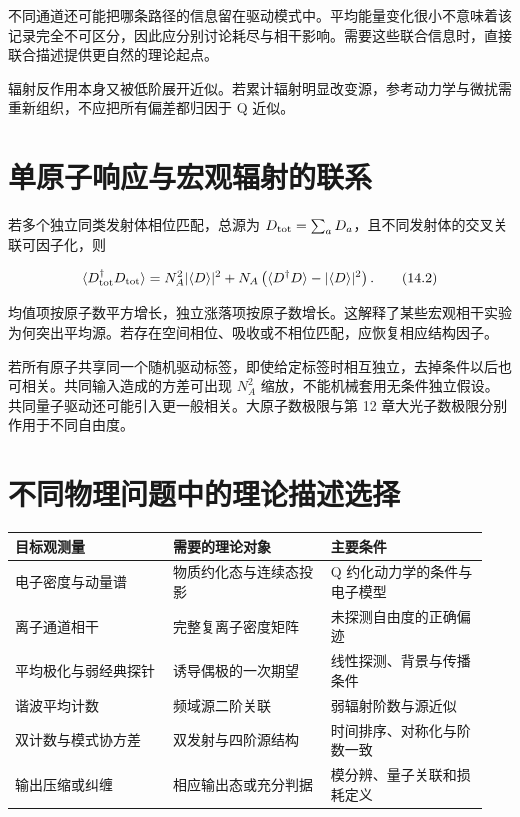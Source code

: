 \documentclass[UTF8,a4paper,zihao=-4,openany,fontset=fandol]{ctexbook}
\begin{document}
不同通道还可能把哪条路径的信息留在驱动模式中。平均能量变化很小不意味着该记录完全不可区分，因此应分别讨论耗尽与相干影响。需要这些联合信息时，直接联合描述提供更自然的理论起点。



辐射反作用本身又被低阶展开近似。若累计辐射明显改变源，参考动力学与微扰需重新组织，不应把所有偏差都归因于 Q 近似。



\section{单原子响应与宏观辐射的联系}\label{sec:14:9}


若多个独立同类发射体相位匹配，总源为 $D_{\rm tot}=\sum_aD_a$，且不同发射体的交叉关联可因子化，则



\begin{equation*}
\langle D_{\rm tot}^\dagger D_{\rm tot}\rangle
=N_A^2|\langle D\rangle|^2
+N_A\left(\langle D^\dagger D\rangle-|\langle D\rangle|^2\right).
\tag{14.2}\label{eq:14.2}
\end{equation*}


均值项按原子数平方增长，独立涨落项按原子数增长。这解释了某些宏观相干实验为何突出平均源。若存在空间相位、吸收或不相位匹配，应恢复相应结构因子。



若所有原子共享同一个随机驱动标签，即使给定标签时相互独立，去掉条件以后也可相关。共同输入造成的方差可出现 $N_A^2$ 缩放，不能机械套用无条件独立假设。共同量子驱动还可能引入更一般相关。大原子数极限与第 12 章大光子数极限分别作用于不同自由度。



\section{不同物理问题中的理论描述选择}\label{sec:14:10}


{\small\setlength{\tabcolsep}{3pt}
\begin{longtable}{@{}p{0.3133\linewidth} p{0.3133\linewidth} p{0.3133\linewidth}@{}}
\toprule
目标观测量 & 需要的理论对象 & 主要条件 \\
\midrule\endhead
电子密度与动量谱 & 物质约化态与连续态投影 & Q 约化动力学的条件与电子模型 \\
离子通道相干 & 完整复离子密度矩阵 & 未探测自由度的正确偏迹 \\
平均极化与弱经典探针 & 诱导偶极的一次期望 & 线性探测、背景与传播条件 \\
谐波平均计数 & 频域源二阶关联 & 弱辐射阶数与源近似 \\
双计数与模式协方差 & 双发射与四阶源结构 & 时间排序、对称化与阶数一致 \\
输出压缩或纠缠 & 相应输出态或充分判据 & 模分辨、量子关联和损耗定义 \\
\bottomrule
\end{longtable}}
\end{document}
